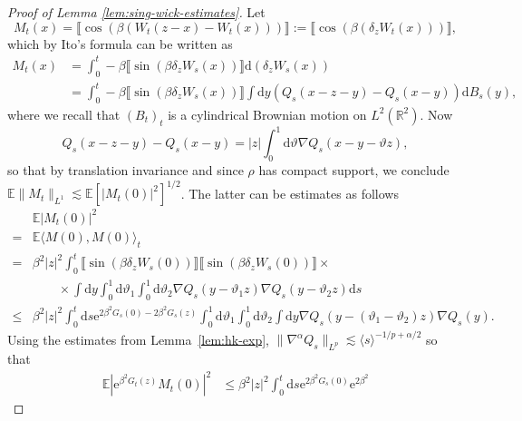 \documentclass[11pt, a4paper]{scrartcl}
\numberwithin{equation}{section}
\theoremstyle{plain}
\theoremstyle{remark}
\newcommand{\assign}{:=}
\newcommand{\mathd}{\mathrm{d}}
\newcommand{\mathe}{\mathrm{e}}
\newcommand{\tmtextbf}[1]{\text{{\bfseries{#1}}}}
\begin{document}
\begin{proof}[Proof of Lemma \ref{lem:sing-wick-estimates}]
	\label{proof-lemma-NC}\tmtextbf{(N)} Let
	\[ M_t (x) = \llbracket \cos (\beta (W_t (z - x) - W_t (x))) \rrbracket
		\assign \llbracket \cos (\beta (\delta_z W_t (x))) \rrbracket, \]
	which by Ito's formula can be written as
	\[ \begin{aligned}
			M_t (x) & = \int_0^t - \beta \llbracket \sin (\beta \delta_z W_s (x))
			\rrbracket \mathd (\delta_z W_s (x))                                  \\
			        & = \int_0^t - \beta \llbracket \sin (\beta \delta_z W_s (x))
			\rrbracket \int \mathd y (Q_s (x - z - y) - Q_s (x - y)) \mathd B_s
			(y),
		\end{aligned} \]
	where we recall that $(B_t)_t$ is a cylindrical Brownian motion on $L^2
		(\mathbb{R}^2)$. Now
	\[ Q_s (x - z - y) - Q_s (x - y) = | z | \int_0^1 \mathd \vartheta \nabla
		Q_s (x - y - \vartheta z), \]
	so that by translation invariance and since $\rho$ has compact support, we conclude  $\mathbb{E} \| M_t \|_{L^1} \lesssim \mathbb{E} [| M_t (0) |^2]^{1 / 2}$.
	The latter can be estimates as follows
	\[ \begin{aligned}
			          & \mathbb{E} | M_t (0) |^2                                          \\
			=         & \mathbb{E} \langle M (0), M (0) \rangle_t                         \\
			=         & \beta^2 | z |^2 \int_0^t \llbracket \sin (\beta \delta_z W_s (0))
			\rrbracket \llbracket \sin (\beta \delta_z W_s (0)) \rrbracket \times         \\
			          & \qquad \times \int \mathd y \int_0^1 \mathd \vartheta_1 \int_0^1
			\mathd \vartheta_2 \nabla Q_s (y - \vartheta_1 z) \nabla Q_s (y -
			\vartheta_2 z) \mathd s                                                       \\
			\leqslant & \beta^2 | z |^2 \int_0^t \mathd s \mathe^{2 \beta^2 G_s (0)
				- 2 \beta^2 G_s (z)} \int_0^1 \mathd \vartheta_1 \int_0^1 \mathd
			\vartheta_2 \int \mathd y \nabla Q_s (y - (\vartheta_1 - \vartheta_2)
			z) \nabla Q_s (y) .
		\end{aligned} \]
	Using the estimates from Lemma~\ref{lem:hk-exp}, $\| \nabla^{\alpha} Q_s
		\|_{L^p} \lesssim \langle s \rangle^{- 1 / p + \alpha / 2}$ so that
	\[ \begin{aligned}
			\mathbb{E} | \mathe^{\beta^2 G_t (z)} M_t (0) |^2 & \leqslant  \beta^2
			| z |^2 \int_0^t \mathd s \mathe^{2 \beta^2 G_s (0)} \mathe^{2 \beta^2
}
\end{aligned}\]
\end{proof}
\end{document}
